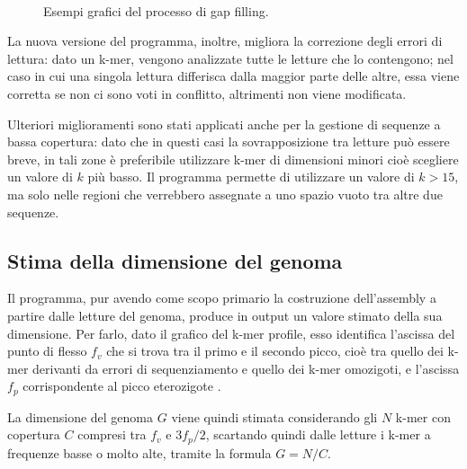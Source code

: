 \documentclass[crop=false, class=book]{standalone}
\begin{document}
	\begin{figure}
		\centering
		 \\
		\caption{Esempi grafici del processo di gap filling.}
		\label{fig:allpathsfilling}
	\end{figure}
	
	La nuova versione del programma, inoltre, migliora la correzione degli errori di lettura: dato un k-mer, vengono analizzate tutte le letture che lo contengono; nel caso in cui una singola lettura differisca dalla maggior parte delle altre, essa viene corretta se non ci sono voti in conflitto, altrimenti non viene modificata.
	
	Ulteriori miglioramenti sono stati applicati anche per la gestione di sequenze a bassa copertura: dato che in questi casi la sovrapposizione tra letture può essere breve, in tali zone è preferibile utilizzare k-mer di dimensioni minori cioè scegliere un valore di $k$ più basso. Il programma permette di utilizzare un valore di $k>15$, ma solo nelle regioni che verrebbero assegnate a uno spazio vuoto tra altre due sequenze. 
	
	\subsection{Stima della dimensione del genoma}
	Il programma, pur avendo come scopo primario la costruzione dell'assembly a partire dalle letture del genoma, produce in output un valore stimato della sua dimensione. Per farlo, dato il grafico del k-mer profile, esso identifica l'ascissa del punto di flesso $f_v$ che si trova tra il primo e il secondo picco, cioè tra quello dei k-mer derivanti da errori di sequenziamento e quello dei k-mer omozigoti, e l'ascissa $f_p$ corrispondente al picco eterozigote \cite{sun2017findGSE}.
	
	La dimensione del genoma $G$ viene quindi stimata considerando gli $N$ k-mer con copertura $C$ compresi tra $f_v$ e $3f_p/2$, scartando quindi dalle letture i k-mer a frequenze basse o molto alte, tramite la formula $G = N/C$.
\end{document}
